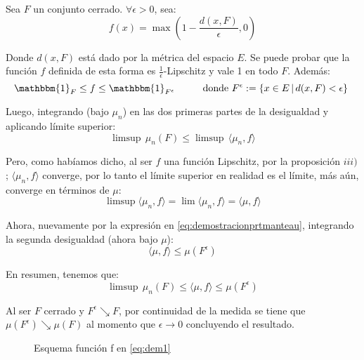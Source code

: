 Sea $F$ un conjunto cerrado. $\forall \epsilon > 0$, sea:
\begin{equation}
   f(x) = \max\left(1-\frac{d(x,F)}{\epsilon}, 0\right)
   \label{eq:dem1}
\end{equation}

Donde $d(x,F)$ está dado por la métrica del espacio $E$. Se puede probar que la función $f$ definida de esta forma es $\frac{1}{\epsilon}$-Lipschitz y vale 1 en todo $F$. Además:
\begin{equation}
    \mathbbm{1}_F \leq f \leq \mathbbm{1}_{F^{\epsilon}}\hspace{1cm}\text{donde }F^{\epsilon}:=\{x\in E\,|\,d(x,F)<\epsilon\}\
    \label{eq:demostracionprtmanteau}
\end{equation}

Luego, integrando (bajo $\mu_n$) en las dos primeras partes de la desigualdad y aplicando límite superior:
\[\limsup\,\mu_n(F)\leq \limsup\,\langle \mu_n,f\rangle\]

Pero, como habíamos dicho, al ser $f$ una función Lipschitz, por la proposición $iii)$; $\langle \mu_n,f\rangle$ converge, por lo tanto el límite superior en realidad es el límite, más aún, converge en términos de $\mu$:
\begin{equation}
    \limsup \langle \mu_n,f\rangle = \lim \langle\mu_n,f\rangle = \langle \mu,f\rangle
\end{equation}

Ahora, nuevamente por la expresión en \ref{eq:demostracionprtmanteau}, integrando la segunda desigualdad (ahora bajo $\mu$):
\[\langle\mu,f\rangle \leq \mu(F^{\epsilon})\]

En resumen, tenemos que:
\[\limsup\,\mu_n(F) \leq \langle\mu,f\rangle \leq\mu(F^{\epsilon})\]

Al ser $F$ cerrado y $F^{\epsilon} \searrow F$, por continuidad de la medida se tiene que $\mu(F^{\epsilon})\searrow \mu(F)$ al momento que $\epsilon \rightarrow 0$ concluyendo el resultado.

\begin{figure}[H]
\centering
    \caption{Esquema función f en \ref{eq:dem1}}
\end{figure}

